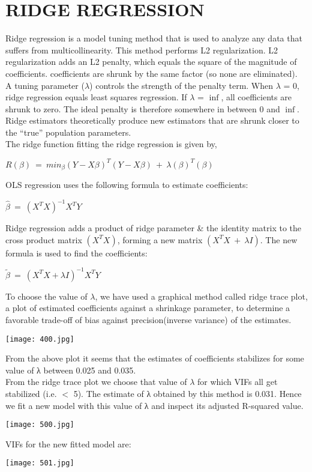 \documentclass[a4paper,12pt,twoside]{book}
\begin{document}
\section{RIDGE REGRESSION}
Ridge regression is a model tuning method that is used to analyze any data that suffers from multicollinearity. This method performs L2 regularization. L2 regularization adds an L2 penalty, which equals the square of the magnitude of coefficients. coefficients are shrunk by the same factor (so none are eliminated).\\
A tuning parameter ($\lambda$) controls the strength of the penalty term. When $\lambda$ = 0, ridge regression equals least squares regression. If $\lambda$ = $\inf$, all coefficients are shrunk to zero. The ideal penalty is therefore somewhere in between 0 and $\inf$.\\
Ridge estimators theoretically produce new estimators that are shrunk closer to the “true” population parameters.\\
The ridge function fitting the ridge regression is given by,
\begin{center}
$R(\beta)\:=\:min_{\beta}(Y-X\beta)^T(Y-X\beta)\:+\:\lambda(\beta)^T(\beta)$
\end{center}
OLS regression uses the following formula to estimate coefficients:\\
\begin{center}
$\hat{\beta}\:=\:(X^TX)^{-1}X^TY$
\end{center}
Ridge regression adds a product of ridge parameter & the identity matrix to the cross product matrix $(X^TX)$, forming a new matrix $(X^TX\:+\:\lambda I)$. The new formula is used to find the coefficients:
\begin{center}
$\tilde{\beta}\:=\:(X^TX+\lambda I)^{-1}X^TY$
\end{center}
To choose the value of $\lambda$, we have used a graphical method called ridge trace plot, a plot of estimated coefficients against a shrinkage parameter, to determine a favorable trade-off of bias against precision(inverse variance) of the estimates.
\begin{center}
\texttt{[image: 400.jpg]}\\
\end{center}
From the above plot it seems that the estimates of coefficients stabilizes for some value of λ between 0.025 and 0.035.\\
From the ridge trace plot we choose that value of $\lambda$ for which VIFs all get stabilized (i.e. $<$ 5). The estimate of λ obtained by this method is 0.031. Hence we fit a new model with this value of λ and inspect its adjusted R-squared value.
\begin{center}
\texttt{[image: 500.jpg]}\\
\end{center}
VIFs for the new fitted model are:
\begin{center}
\texttt{[image: 501.jpg]}\\
\end{center}
\end{document}
